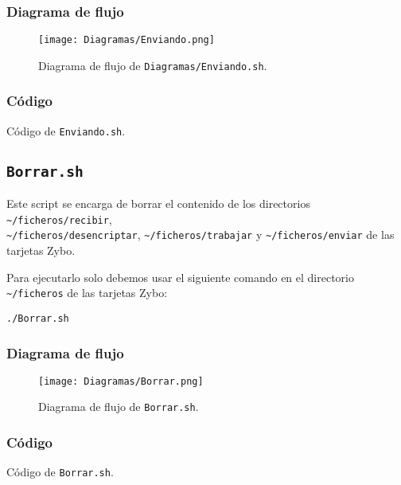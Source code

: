 \documentclass[12pt,letterpaper]{article}
\begin{document}
\newpage
\subsubsection{Diagrama de flujo}
\begin{figure}[h]
	\centering
	\texttt{[image: Diagramas/Enviando.png]}
	\caption{Diagrama de flujo de \texttt{Diagramas/Enviando.sh}.}
	\label{Diagrama de flujo de Enviando.sh}
\end{figure}

\newpage
\subsubsection{Código}

\begin{center}
	Código de \texttt{Enviando.sh}.
\end{center}


\subsection{\texttt{Borrar.sh}}
Este script se encarga de borrar el contenido de los directorios \texttt{\textasciitilde/ficheros/recibir},\\ \texttt{\textasciitilde/ficheros/desencriptar}, \texttt{\textasciitilde/ficheros/trabajar} y \texttt{\textasciitilde/ficheros/enviar} de las tarjetas Zybo.

Para ejecutarlo solo debemos usar el siguiente comando en el directorio \texttt{\textasciitilde/ficheros} de las tarjetas Zybo:
\begin{center}
	\texttt{./Borrar.sh}
\end{center}

\subsubsection{Diagrama de flujo}
\begin{figure}[h]
	\centering
	\texttt{[image: Diagramas/Borrar.png]}
	\caption{Diagrama de flujo de \texttt{Borrar.sh}.}
	\label{Diagrama de flujo de Borrar.sh}
\end{figure}

\newpage
\subsubsection{Código}

\begin{center}
	Código de \texttt{Borrar.sh}.
\end{center}
\end{document}
